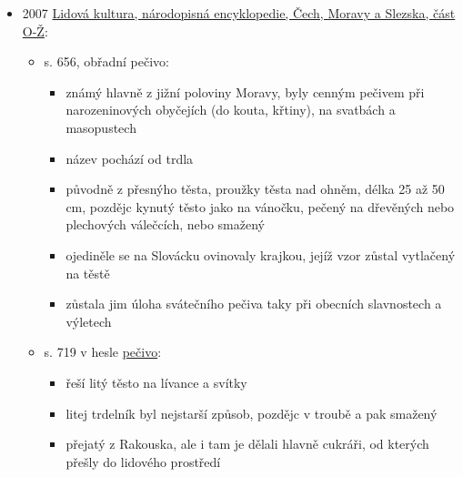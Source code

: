 \begin{itemize}
\begin{itemize}
\begin{itemize}
      \begin{itemize}
      \tightlist
      \item
        kuchyňské nádobí a náčiní
      \item
        trdlo na pečení = váleček na trdelníky
      \end{itemize}
    \item
      s. 583:

      \begin{itemize}
      \tightlist
      \item
        moučné pokrmy, pečivo k svátečním příležitostem, smažené listy
        či boží milosti, šišky, koblihy, na j. Moravě trdelníky
      \end{itemize}
    \end{itemize}
  \end{itemize}
\item
  2007
  \href{https://www.eu.avcr.cz/export/sites/eu/.content/files/Narodopisna_encyklopedie/O.pdf}{Lidová
  kultura, národopisná encyklopedie, Čech, Moravy a Slezska, část O-Ž}:

  \begin{itemize}
  \tightlist
  \item
    s. 656, obřadní pečivo:

    \begin{itemize}
    \tightlist
    \item
      známý hlavně z jižní poloviny Moravy, byly cenným pečivem při
      narozeninových obyčejích (do kouta, křtiny), na svatbách a
      masopustech
    \item
      název pochází od trdla
    \item
      původně z přesnýho těsta, proužky těsta nad ohněm, délka 25 až 50
      cm, pozdějc kynutý těsto jako na vánočku, pečený na dřevěných nebo
      plechových válečcích, nebo smažený
    \item
      ojediněle se na Slovácku ovinovaly krajkou, jejíž vzor zůstal
      vytlačený na těstě
    \item
      zůstala jim úloha svátečního pečiva taky při obecních slavnostech
      a výletech
    \end{itemize}
  \item
    s. 719 v hesle
    \href{https://www.eu.avcr.cz/export/sites/eu/.content/files/Narodopisna_encyklopedie/P.pdf}{pečivo}:

    \begin{itemize}
    \tightlist
    \item
      řeší litý těsto na lívance a svítky
    \item
      litej trdelník byl nejstarší způsob, pozdějc v troubě a pak
      smažený
    \item
      přejatý z Rakouska, ale i tam je dělali hlavně cukráři, od kterých
      přešly do lidového prostředí


\end{itemize}
\end{itemize}
\end{itemize}
